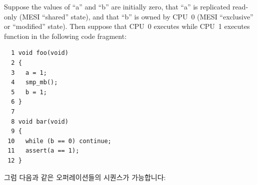 Suppose the values of ``a'' and ``b'' are initially zero,
that ``a'' is replicated read-only (MESI ``shared'' state),
and that ``b''
is owned by CPU~0 (MESI ``exclusive'' or ``modified'' state).
Then suppose that CPU~0 executes  while CPU~1 executes
function  in the following code fragment:
\fi

\vspace{5pt}
\begin{minipage}[t]{\columnwidth}
\small
\begin{verbatim}
  1 void foo(void)
  2 {
  3   a = 1;
  4   smp_mb();
  5   b = 1;
  6 }
  7
  8 void bar(void)
  9 {
 10   while (b == 0) continue;
 11   assert(a == 1);
 12 }
\end{verbatim}
\end{minipage}
\vspace{5pt}

그럼 다음과 같은 오퍼레이션들의 시퀀스가 가능합니다:
\iffalse

